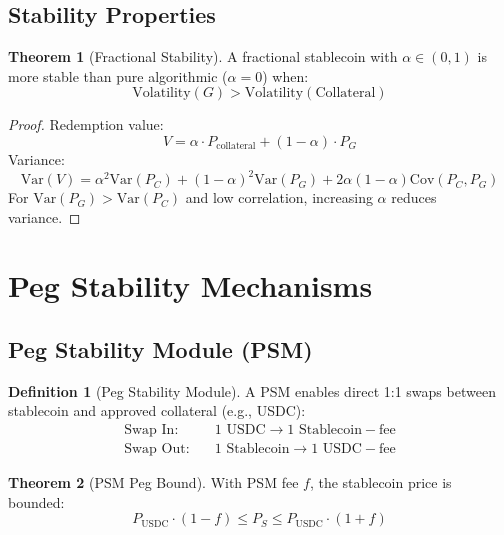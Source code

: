 \documentclass[11pt,a4paper]{article}
\theoremstyle{definition}
\newtheorem{definition}{Definition}
\newtheorem{theorem}{Theorem}
\begin{document}
\subsection{Stability Properties}

\begin{theorem}[Fractional Stability]
A fractional stablecoin with $\alpha \in (0, 1)$ is more stable than pure algorithmic ($\alpha = 0$) when:
\begin{equation}
\text{Volatility}(G) > \text{Volatility}(\text{Collateral})
\end{equation}
\end{theorem}

\begin{proof}
Redemption value:
\begin{equation}
V = \alpha \cdot P_{\text{collateral}} + (1 - \alpha) \cdot P_G
\end{equation}
Variance:
\begin{equation}
\text{Var}(V) = \alpha^2 \text{Var}(P_C) + (1-\alpha)^2 \text{Var}(P_G) + 2\alpha(1-\alpha)\text{Cov}(P_C, P_G)
\end{equation}
For $\text{Var}(P_G) > \text{Var}(P_C)$ and low correlation, increasing $\alpha$ reduces variance.
\end{proof}

\section{Peg Stability Mechanisms}

\subsection{Peg Stability Module (PSM)}

\begin{definition}[Peg Stability Module]
A PSM enables direct 1:1 swaps between stablecoin and approved collateral (e.g., USDC):
\begin{align}
\text{Swap In}: & \quad 1 \text{ USDC} \rightarrow 1 \text{ Stablecoin} - \text{fee} \\
\text{Swap Out}: & \quad 1 \text{ Stablecoin} \rightarrow 1 \text{ USDC} - \text{fee}
\end{align}
\end{definition}

\begin{theorem}[PSM Peg Bound]
With PSM fee $f$, the stablecoin price is bounded:
\begin{equation}
P_{\text{USDC}} \cdot (1 - f) \leq P_S \leq P_{\text{USDC}} \cdot (1 + f)
\end{equation}
\end{theorem}
\end{document}
